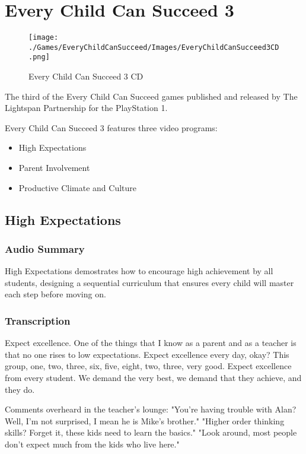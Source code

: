 \chapter{Every Child Can Succeed 3}

\begin{figure}[H]
    \centering
    \texttt{[image: ./Games/EveryChildCanSucceed/Images/EveryChildCanSucceed3CD.png]}
    \caption{Every Child Can Succeed 3 CD}
\end{figure}

The third of the Every Child Can Succeed games published and released by The Lightspan Partnership for the PlayStation 1.

Every Child Can Succeed 3 features three video programs:

\begin{itemize}
    \item High Expectations
    \item Parent Involvement
    \item Productive Climate and Culture
\end{itemize}

\clearpage
\newpage

\section{High Expectations}

\subsection{Audio Summary}

High Expectations demostrates how to encourage high achievement by all students, designing a sequential curriculum that ensures every child will master each step before moving on.

\subsection{Transcription}

Expect excellence.
One of the things that I know as a parent and as a teacher is that no one rises to low expectations.
Expect excellence every day, okay?
This group, one, two, three, six, five, eight, two, three, very good.
Expect excellence from every student.
We demand the very best, we demand that they achieve, and they do.

Comments overheard in the teacher's lounge: "You're having trouble with Alan?
Well, I'm not surprised, I mean he is Mike's brother." "Higher order thinking skills?
Forget it, these kids need to learn the basics." "Look around, most people don't expect much from the kids who live here."

